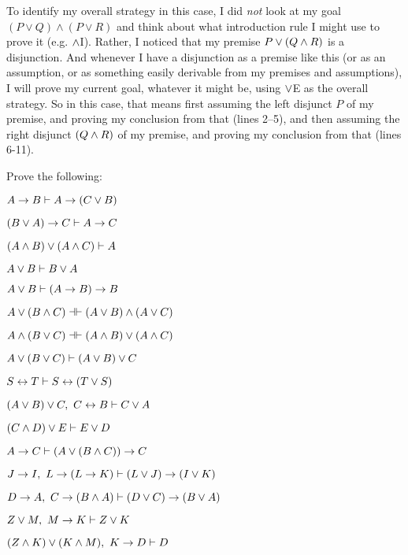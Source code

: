 To identify my overall strategy in this case, I did \emph{not} look at my goal $(P\lor Q)\land (P\lor R)$ and think about what introduction rule I might use to prove it (e.g. $\wedge$I).  Rather, I noticed that my premise $P \vee (Q \wedge R)$ is a disjunction.  And whenever I have a disjunction as a premise like this (or as an assumption, or as something easily derivable from my premises and assumptions), I will prove my current goal, whatever it might be, using $\vee$E as the overall strategy. So in this case, that means first assuming the left disjunct $P$ of my premise, and proving my conclusion from that (lines 2--5), and then assuming the right disjunct $(Q \wedge R)$ of my premise, and proving my conclusion from that (lines 6-11).



\practiceproblems

\problempart
Prove the following:

\begin{earg}
\item $A \rightarrow B \vdash A \rightarrow (C \vee B)$
\item $(B \vee A) \rightarrow C \vdash A \rightarrow C$
\item $(A \wedge B) \vee (A \wedge C) \vdash A$
\item $A \vee B \vdash B \vee A$
\item  $A \vee B \vdash (A\rightarrow B) \rightarrow B$ 
\item $A \eor (B \eand C) \pequiv (A \eor B) \eand (A \eor C)$
\item $ A \eand (B \eor C) \pequiv (A \eand B) \eor (A \eand C)$
\item $A \vee (B \vee C) \vdash (A \vee B) \vee C$
\item $S\leftrightarrow T \vdash S\leftrightarrow (T\vee S)$
\item $(A \vee B) \vee C, \ C \leftrightarrow B \vdash C \vee A$
\item $(C\wedge D)\vee E \vdash E\vee D$
\item $A \rightarrow  C \vdash (A \vee (B \wedge C)) \rightarrow C$ 
\item $J \rightarrow I, \ L \rightarrow (L \rightarrow K)  \vdash (L \vee J) \rightarrow (I \vee K)$
\item $D \rightarrow A, \ C \rightarrow (B \wedge A) \vdash (D \vee C) \rightarrow (B \vee A)$
\item $Z \lor M, \ M \rightarrow K \vdash  Z \lor K $
\item $(Z\wedge K) \vee (K\wedge M),  \ K \rightarrow D \vdash D$
\end{earg}



